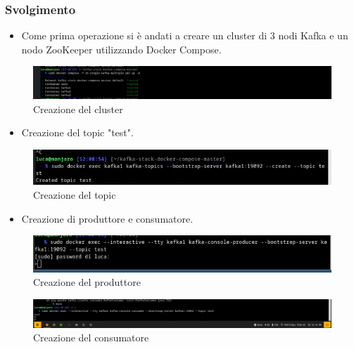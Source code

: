\documentclass{article}
\begin{document}
\subsubsection{Svolgimento}
\begin{itemize}
    \item Come prima operazione si è andati a creare un cluster di 3 nodi Kafka e un nodo ZooKeeper utilizzando Docker Compose.
\end{itemize}
\begin{figure}[H]
    \centering
    \includegraphics[scale=0.5]{images/cluster.png}
    \caption{Creazione del cluster}
    \label{fig:my_label}
\end{figure}
\begin{itemize}
    \item Creazione del topic "test".
\end{itemize}
\begin{figure}[H]
    \centering
    \includegraphics[scale=0.5]{images/create_topic.png}
    \caption{Creazione del topic}
    \label{fig:my_label}
\end{figure}
\begin{itemize}
    \item Creazione di produttore e consumatore.
\end{itemize}
\begin{figure}[H]
    \centering
    \includegraphics[scale=0.5]{images/produttore.png}
    \caption{Creazione del produttore}
    \label{fig:my_label}
\end{figure}
\begin{figure}[H]
    \centering
    \includegraphics[scale=0.5]{images/consumatore.png}
    \caption{Creazione del consumatore}
    \label{fig:my_label}
\end{figure}
\end{document}
